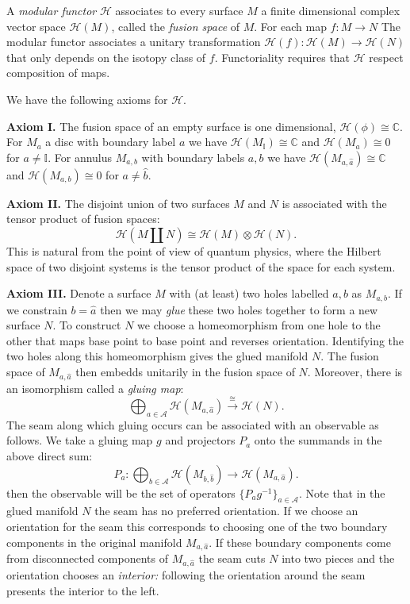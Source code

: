 \documentclass[aps, prl, letterpaper, twocolumn, superscriptaddress, notitlepage, 10pt]{revtex4-1}
\newcommand{\vac}{\mathbb{I}}
\newcommand{\F}{\mathscr{H}} %
\newcommand{\C}{\mathbb{C}}
\newcommand{\A}{\mathcal{A}}
\begin{document}
A \emph{modular functor} $\F$ associates to every
surface $M$ a finite dimensional complex
vector space $\F(M)$, called the \emph{fusion space} of $M$.
For each map $f:M\to N$
The modular functor associates a
unitary transformation $\F(f) : \F(M)\to\F(N)$
that only depends on the isotopy class of $f.$
Functoriality requires that $\F$
respect composition of maps.

We have the following axioms for $\F.$

{\bf Axiom I.}
The fusion space of an empty surface is one dimensional, 
$\F(\phi) \cong \C.$ %
For $M_a$ a disc with boundary label $a$ we have
$\F(M_\vac)\cong \C$ and 
$\F(M_a)\cong 0$ for $a\ne \vac.$
For annulus $M_{a,b}$ with boundary labels
$a, b$ we have
$\F(M_{a,\widehat{a}})\cong \C$ and 
$\F(M_{a,b})\cong 0$ for $a\ne \widehat{b}.$

{\bf Axiom II.}
The disjoint union of two surfaces $M$ and $N$ 
is associated with
the tensor product of fusion spaces:
$$
    \F(M\amalg N) \cong \F(M)\otimes \F(N).
$$
This is natural from the point of view of quantum
physics, where the Hilbert space of two disjoint
systems is the tensor product of the space for
each system.

{\bf Axiom III.}
Denote a surface $M$ with (at least) two holes
labelled $a, b$ as $M_{a,b}$. 
If we constrain $b=\widehat{a}$ 
then we may \emph{glue} these two holes together
to form a new surface $N.$
To construct $N$ we choose a homeomorphism from one
hole to the other that maps base point to base point 
and reverses orientation.
Identifying the two holes along this homeomorphism
gives the glued manifold $N.$
The fusion space of $M_{a,\widehat{a}}$ then embedds unitarily in the fusion
space of $N.$
Moreover, there is an isomorphism called
a \emph{gluing map}:
$$
    \bigoplus_{a\in\A} \F(M_{a,\widehat{a}}) \xrightarrow{\cong} \F(N).
$$
The seam along which gluing occurs can be associated
with an observable as follows.
We take a gluing map $g$ and projectors $P_a$ onto the
summands in the above direct sum:
$$
    P_a: \bigoplus_{b\in\A} \F(M_{b,\widehat{b}}) \to \F(M_{a,\widehat{a}}).
$$
then the observable will be the set of operators $\{P_a g^{-1}\}_{a\in\A}.$
Note that in the glued manifold $N$ the seam has no
preferred orientation. If we choose an orientation 
for the seam this corresponds to choosing one of the
two boundary components in the original manifold $M_{a,\widehat{a}}.$
If these boundary components come from disconnected components of 
$M_{a,\widehat{a}}$ the seam cuts $N$ into two pieces and the
orientation chooses an \emph{interior:}
following the orientation around the seam presents
the interior to the left.
\end{document}
